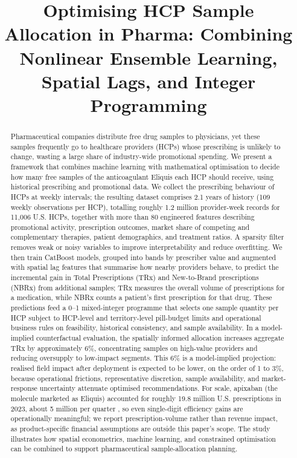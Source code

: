 \title[Optimising HCP Sample Allocation in Pharma]{Optimising HCP Sample Allocation in Pharma: Combining Nonlinear Ensemble Learning, Spatial Lags, and Integer Programming}

\begin{abstract}
Pharmaceutical companies distribute free drug samples to physicians, yet these samples frequently go to healthcare providers (HCPs) whose prescribing is unlikely to change, wasting a large share of industry-wide promotional spending. We present a framework that combines machine learning with mathematical optimisation to decide how many free samples of the anticoagulant Eliquis each HCP should receive, using historical prescribing and promotional data. We collect the prescribing behaviour of HCPs at weekly intervals; the resulting dataset comprises 2.1 years of history (109 weekly observations per HCP), totalling roughly 1.2 million provider-week records for 11,006 U.S. HCPs, together with more than 80 engineered features describing promotional activity, prescription outcomes, market share of competing and complementary therapies, patient demographics, and treatment ratios. A sparsity filter removes weak or noisy variables to improve interpretability and reduce overfitting. We then train CatBoost models, grouped into bands by prescriber value and augmented with spatial lag features that summarise how nearby providers behave, to predict the incremental gain in Total Prescriptions (TRx) and New-to-Brand prescriptions (NBRx) from additional samples; TRx measures the overall volume of prescriptions for a medication, while NBRx counts a patient's first prescription for that drug. These predictions feed a 0--1 mixed-integer programme that selects one sample quantity per HCP subject to HCP-level and territory-level pill-budget limits and operational business rules on feasibility, historical consistency, and sample availability. In a model-implied counterfactual evaluation, the spatially informed allocation increases aggregate TRx by approximately 6\%, concentrating samples on high-value providers and reducing oversupply to low-impact segments. This 6\% is a model-implied projection: realised field impact after deployment is expected to be lower, on the order of 1 to 3\%, because operational frictions, representative discretion, sample availability, and market-response uncertainty attenuate optimised recommendations. For scale, apixaban (the molecule marketed as Eliquis) accounted for roughly 19.8 million U.S. prescriptions in 2023, about 5 million per quarter \citep{ClinCalcApixaban2023}, so even single-digit efficiency gains are operationally meaningful; we report prescription-volume rather than revenue impact, as product-specific financial assumptions are outside this paper's scope. The study illustrates how spatial econometrics, machine learning, and constrained optimisation can be combined to support pharmaceutical sample-allocation planning.
\end{abstract}

